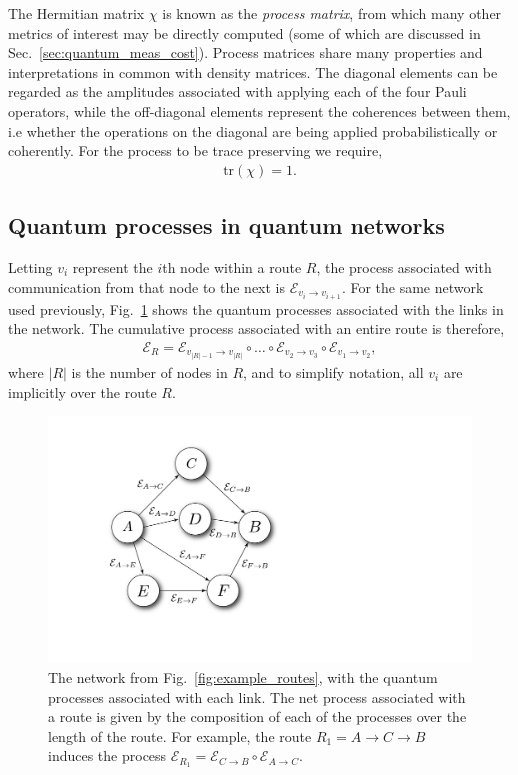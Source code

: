 \documentclass[aps,rmp,twocolumn,amsmath,amssymb,nofootinbib,superscriptaddress]{revtex4}
\begin{document}
The Hermitian matrix $\chi$ is known as the \emph{process matrix}, from which many other metrics of interest may be directly computed (some of which are discussed in Sec.~\ref{sec:quantum_meas_cost}). Process matrices share many properties and interpretations in common with density matrices. The diagonal elements can be regarded as the amplitudes associated with applying each of the four Pauli operators, while the off-diagonal elements represent the coherences between them, i.e whether the operations on the diagonal are being applied probabilistically or coherently. For the process to be trace preserving we require,
\begin{align}
\mathrm{tr}(\chi) = 1.
\end{align}

%
%

\subsection{Quantum processes in quantum networks} \label{sec:quant_proc_in}

Letting $v_i$ represent the $i$th node within a route $R$, the process associated with communication from that node to the next is $\mathcal{E}_{v_i\to v_{i+1}}$. For the same network used previously, Fig.~\ref{fig:example_proc_graph} shows the quantum processes associated with the links in the network. The cumulative process associated with an entire route is therefore,
\begin{align}
\mathcal{E}_R = \mathcal{E}_{{v_{|R|-1}}\to v_{|R|}} \circ \dots \circ \mathcal{E}_{v_2\to v_3} \circ \mathcal{E}_{v_1\to v_2},
\end{align}
where $|R|$ is the number of nodes in $R$, and to simplify notation, all $v_i$ are implicitly over the route $R$.

\begin{figure}[!htb]
\includegraphics[width=0.6\columnwidth]{example_graph}
\caption{The network from Fig.~\ref{fig:example_routes}, with the quantum processes associated with each link. The net process associated with a route is given by the composition of each of the processes over the length of the route. For example, the route \mbox{$R_1=A\to C\to B$} induces the process \mbox{$\mathcal{E}_{R_1} = \mathcal{E}_{C\to B} \circ \mathcal{E}_{A\to C}$}.} \label{fig:example_proc_graph}
\end{figure}
\end{document}
